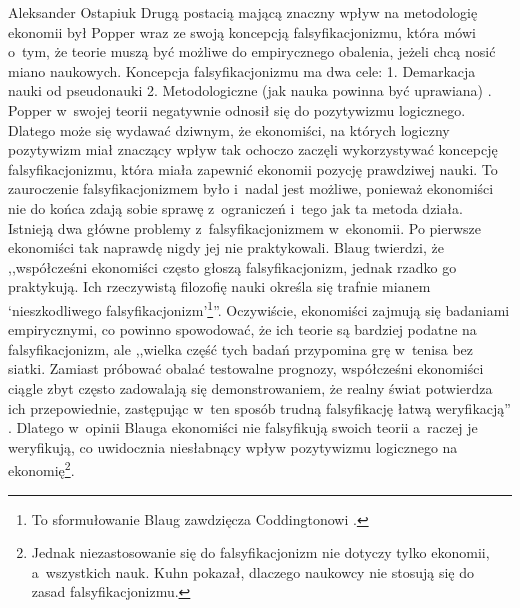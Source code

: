 \begin{artplenv}{Aleksander Ostapiuk}
Drugą postacią mającą znaczny wpływ na metodologię ekonomii był Popper wraz ze swoją koncepcją falsyfikacjonizmu, która
mówi o~tym, że teorie muszą być możliwe do empirycznego obalenia, jeżeli chcą nosić miano naukowych. Koncepcja
falsyfikacjonizmu ma dwa cele: 1. Demarkacja nauki od pseudonauki 2. Metodologiczne (jak nauka powinna być uprawiana)
\parencite{hands_popper_1993}.
Popper w~swojej teorii negatywnie odnosił się do pozytywizmu logicznego.
Dlatego może się wydawać dziwnym, że ekonomiści, na których logiczny pozytywizm miał znaczący wpływ tak ochoczo zaczęli
wykorzystywać koncepcję falsyfikacjonizmu, która miała zapewnić ekonomii pozycję prawdziwej nauki. To zauroczenie
falsyfikacjonizmem było i~nadal jest możliwe, ponieważ ekonomiści nie do końca zdają sobie sprawę z~ograniczeń i~tego
jak ta metoda działa. Istnieją dwa główne problemy z~falsyfikacjonizmem w~ekonomii. Po pierwsze ekonomiści tak naprawdę
nigdy jej nie praktykowali. Blaug
\parencite*[s.~175]{blaug_metodologia_1995}
twierdzi, że ,,współcześni ekonomiści często
głoszą falsyfikacjonizm, jednak rzadko go praktykują. Ich rzeczywistą filozofię nauki określa się trafnie mianem
`nieszkodliwego falsyfikacjonizm'\footnote{To sformułowanie Blaug zawdzięcza Coddingtonowi
\parencite[s.~542]{coddington_rationale_1975}.
}''.
Oczywiście, ekonomiści zajmują się badaniami empirycznymi, co powinno
spowodować, że ich teorie są bardziej podatne na falsyfikacjonizm, ale ,,wielka część tych badań przypomina grę w~tenisa
bez siatki. Zamiast próbować obalać testowalne prognozy, współcześni ekonomiści ciągle zbyt często zadowalają się
demonstrowaniem, że realny świat potwierdza ich przepowiednie, zastępując w~ten sposób trudną falsyfikację łatwą
weryfikacją''
\parencite[s.~348]{blaug_metodologia_1995}.
Dlatego w~opinii Blauga ekonomiści nie falsyfikują swoich
teorii a~raczej je weryfikują, co uwidocznia niesłabnący wpływ pozytywizmu logicznego na ekonomię\footnote{Jednak
niezastosowanie się do falsyfikacjonizm nie dotyczy tylko ekonomii, a~wszystkich nauk. Kuhn
\parencite*{kuhn_structure_1962}
pokazał, dlaczego naukowcy nie stosują się do zasad falsyfikacjonizmu.}. 


\end{artplenv}
